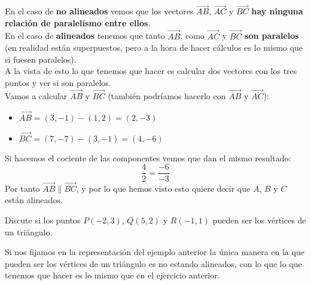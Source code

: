 \documentclass[a4paper,11pt,answers]{exam}
\begin{document}
\begin{questions}
\begin{solution}
    En el caso de \textbf{no alineados} vemos que los vectores $\overrightarrow{AB}$,
    $\overrightarrow{AC}$ y $\overrightarrow{BC}$ \textbf{hay ninguna relación de paralelismo entre
    ellos}.\\
    En el caso de \textbf{alineados} tenemos que tanto $\overrightarrow{AB}$, como
    $\overrightarrow{AC}$ y $\overrightarrow{BC}$ \textbf{son paralelos} (en realidad están
    superpuestos, pero a la hora de hacer cálculos es lo mismo que si fuesen paralelos).\\

    A la vista de esto lo que tenemos que hacer es calcular dos vectores con los tres puntos y ver
    si son paralelos.\\
    Vamos a calcular $\overrightarrow{AB}$ y $\overrightarrow{BC}$ (también podríamos hacerlo
    con $\overrightarrow{AB}$ y $\overrightarrow{AC}$):
    \begin{itemize}
    \item $\overrightarrow{AB} = (3,-1) - (1,2) = (2,-3)$
    \item $\overrightarrow{BC} = (7,-7) - (3,-1) = (4,-6)$
    \end{itemize}
    Si hacemos el cociente de las componentes vemos que dan el mismo resultado:
    \[\frac{4}{2} = \frac{-6}{-3}\]
    Por tanto $\overrightarrow{AB} \parallel \overrightarrow{BC}$, y por lo que hemos visto esto
    quiere decir que $A$, $B$ y $C$ están alineados.
  \end{solution}
\question Discute si los puntos $P(-2, 3)$, $Q(5, 2)$ y $R(-1, 1)$ pueden ser los vértices de un
  triángulo.
  \begin{solution}
    Si nos fijamos en la representación del ejemplo anterior la única manera en la que pueden ser
    los vértices de un triángulo es no estando alineados, con lo que lo que tenemos que hacer es
    lo mismo que en el ejercicio anterior.\\


\end{solution}
\end{questions}
\end{document}
